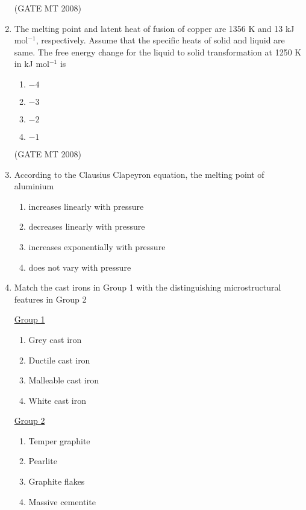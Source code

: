 \documentclass[journal, 11pt, onecolumn]{IEEEtran}
\theoremstyle{remark}
\begin{document}
\begin{enumerate}
\hfill(GATE MT 2008) 
\item The melting point and latent heat of fusion of copper are 1356 K and 13 kJ mol$^{-1}$, respectively. 
Assume that the specific heats of solid and liquid are same. 
The free energy change for the liquid to solid transformation at 1250 K in kJ mol$^{-1}$ is

\begin{multicols}{4}
\begin{enumerate} 
\item $-4$
\item $-3$
\item $-2$
\item $-1$
\end{enumerate}
\end{multicols}

\hfill(GATE MT 2008) 

\item According to the Clausius Clapeyron equation, the melting point of aluminium

\begin{multicols}{2}
\begin{enumerate} 
\item increases linearly with pressure
\item decreases linearly with pressure
\item increases exponentially with pressure
\item does not vary with pressure
\end{enumerate}
\end{multicols}

\item Match the cast irons in Group 1 with the distinguishing microstructural features in Group 2
\begin{multicols}{2}
\underline{Group 1}
\begin{enumerate}[label=(\Alph*), start=16]
\item Grey cast iron
\item Ductile cast iron  
\item Malleable cast iron
\item White cast iron
\end{enumerate}

\underline{Group 2}
\begin{enumerate}[label=(\arabic*), start=1]
\item Temper graphite
\item Pearlite
\item Graphite flakes  
\item Massive cementite
\end{enumerate}
\end{multicols}


\end{enumerate}
\end{document}
